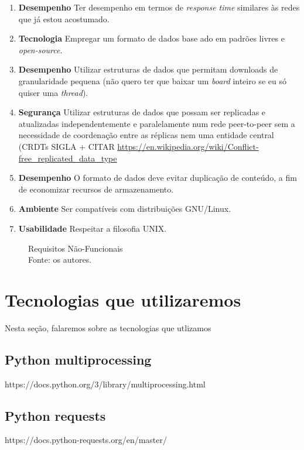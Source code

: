 \begin{enumerate}
    \item \textbf{Desempenho} Ter desempenho em termos de \textit{response time} similares às redes que já estou acostumado.
    \item \textbf{Tecnologia} Empregar um formato de dados base ado em padrões livres e \textit{open-source}.
    \item \textbf{Desempenho} Utilizar estruturas de dados que permitam downloads de granularidade pequena (não quero ter que baixar um \textit{board} inteiro se eu só quiser uma \textit{thread}).
    \item \textbf{Segurança} Utilizar estruturas de dados que possam ser replicadas e atualizadas independentemente e paralelamente num rede peer-to-peer sem a necessidade de coordenação entre as réplicas nem uma entidade central (CRDTs SIGLA + CITAR \url{https://en.wikipedia.org/wiki/Conflict-free_replicated_data_type}
    \item \textbf{Desempenho} O formato de dados deve evitar duplicação de conteúdo, a fim de economizar recursos de armazenamento.
    \item \textbf{Ambiente} Ser compatíveis com distribuições GNU/Linux.
    \item \textbf{Usabilidade} Respeitar a filosofia UNIX.
\end{enumerate}
\begin{figure}[H]
    \centering
    
    \caption[Requisitos Não-Funcionais]{\label{fig:Requisitos_Nao_Funcionais}
        Requisitos Não-Funcionais\\
        Fonte: os autores.
    }
\end{figure}
\section{Tecnologias que utilizaremos}

Nesta seção, falaremos sobre as tecnologias que utlizamos 

\subsection{Python multiprocessing}
https://docs.python.org/3/library/multiprocessing.html

\subsection{Python requests}
https://docs.python-requests.org/en/master/

